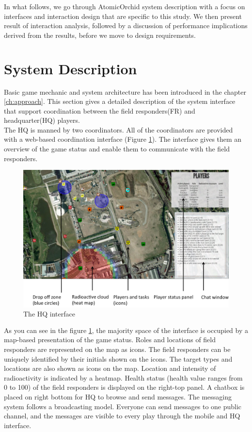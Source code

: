 In what follows, we go through AtomicOrchid system description with a focus on interfaces and interaction design that are specific to this study. We then present result of interaction analysis, followed by a discussion of performance implications derived from the results, before we move to design requirements.  \\

\section{System Description}\label{sec:system1}
Basic game mechanic and system architecture has been introduced in the chapter \ref{ch:approach}. This section gives a detailed description of the system interface that support coordination between the field responders(FR) and headquarter(HQ) players. \\

The HQ is manned by two coordinators. All of the coordinators are provided with a web-based coordination interface (Figure \ref{fig:HQinterface}). The interface gives them an overview of the game status and enable them to communicate with the field responders. \\

\begin{figure}[h]
  \centering
  \includegraphics[width=1\textwidth]{img/study1/webinterface}
  \caption{The HQ interface}
  \label{fig:HQinterface}
\end{figure}

As you can see in the figure \ref{fig:HQinterface}, the majority space of the interface is occupied by a map-based presentation of the game status. Roles and locations of field responders are represented on the map as icons. The field responders can be uniquely identified by their initials shown on the icons. The target types and locations are also shown as icons on the map. Location and intensity of radioactivity is indicated by a heatmap. Health status (health value ranges from 0 to 100) of the field responders is displayed on the right-top panel. A chatbox is placed on right bottom for HQ to browse and send messages. The messaging system follows a broadcasting model. Everyone can send messages to one public channel, and the messages are visible to every play through the mobile and HQ interface.\\

